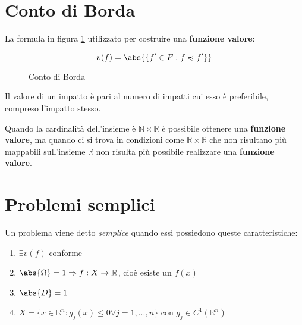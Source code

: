 \documentclass[\main/main.tex]{subfiles}
\begin{document}
\section{Conto di Borda}
La formula in figura \ref{borda} utilizzato per costruire una \textbf{funzione valore}:

\begin{figure}[H]
\[ 
	v(f) = \abs{\{f' \in F: f \preccurlyeq f' \}}
\]
\caption{Conto di Borda}
\label{borda}
\end{figure}

Il valore di un impatto è pari al numero di impatti cui esso è preferibile, compreso l'impatto stesso.

Quando la cardinalità dell'insieme è $\mathbb{N}\times\mathbb{R}$ è possibile ottenere una \textbf{funzione valore}, ma quando ci si trova in condizioni come $\mathbb{R}\times\mathbb{R}$ che non risultano più mappabili sull'insieme $\mathbb{R}$ non risulta più possibile realizzare una \textbf{funzione valore}.

\section{Problemi semplici}
Un problema viene detto \textit{semplice} quando essi possiedono queste caratteristiche:

\begin{enumerate}
\item $\exists v(f) $ conforme
\item $\abs{\Omega} = 1 \Rightarrow f: X \rightarrow \mathbb{R}$, cioè esiste un $f(x)$
\item $\abs{D} = 1$
\item $X = \{x \in \mathbb{R}^n: g_j (x) \leq 0 \forall j = 1,..., n \} \text{ con } g_j \in C^1(\mathbb{R}^n)$
\end{enumerate}
\end{document}
